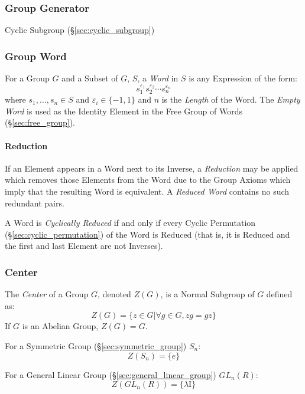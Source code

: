 \subsubsection{Group Generator}\label{sec:group_generator}

Cyclic Subgroup (\S\ref{sec:cyclic_subgroup})



\subsubsection{Group Word}\label{sec:group_word}

For a Group $G$ and a Subset of $G$, $S$, a \emph{Word} in $S$ is any
Expression of the form:
\[
    s_1^{\varepsilon_1}s_2^{\varepsilon_2} \cdots s_n^{\varepsilon_n}
\]
where $s_1,\ldots,s_n \in S$ and $\varepsilon_i \in \{-1, 1\}$ and $n$
is the \emph{Length} of the Word. The \emph{Empty Word} is used as the
Identity Element in the Free Group of Words (\S\ref{sec:free_group}).



\paragraph{Reduction}\label{sec:word_reduction}\hfill

If an Element appears in a Word next to its Inverse, a
\emph{Reduction} may be applied which removes those Elements from the
Word due to the Group Axioms which imply that the resulting Word is
equivalent. A \emph{Reduced Word} contains no such redundant pairs.

A Word is \emph{Cyclically Reduced} if and only if every Cyclic
Permutation (\S\ref{sec:cyclic_permutation}) of the Word is Reduced
(that is, it is Reduced and the first and last Element are not
Inverses).



\subsubsection{Center}\label{sec:group_center}

The \emph{Center} of a Group $G$, denoted $Z(G)$, is a Normal Subgroup
of $G$ defined as:
\[
    Z(G) = \{ z \in G | \forall g \in G, zg = gz \}
\]
If $G$ is an Abelian Group, $Z(G) = G$.

For a Symmetric Group (\S\ref{sec:symmetric_group}) $S_n$:
\[
    Z(S_n) = \{e\}
\]

For a General Linear Group (\S\ref{sec:general_linear_group})
$GL_n(R)$:
\[
    Z(GL_n(R)) = \{\lambda \mathrm{I}\}
\]

